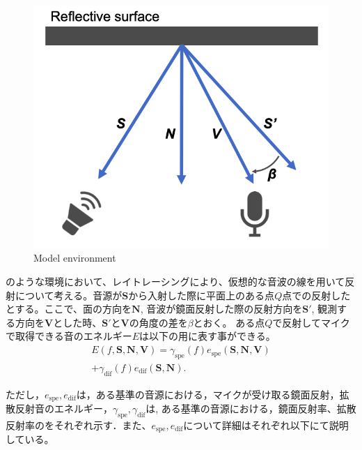 \begin{figure}[t]
  \begin{center}
  \vspace{1zh}
    \includegraphics[width=0.7\linewidth]{images/2_model_base_environment.png}   
  \end{center}
  \caption{Model environment}
  \label{fig:model_env}
\end{figure}

のような環境において、レイトレーシングにより、仮想的な音波の線を用いて反射について考える。音源が$\mathbf{S}$から入射した際に平面上のある点$Q$点での反射したとする。ここで、面の方向を$\mathbf{N}$, 音波が鏡面反射した際の反射方向を$\mathbf{S'}$, 観測する方向を$\mathbf{V}$とした時、$\mathbf{S'}$と$\mathbf{V}$の角度の差を$\beta$とおく。
ある点$Q$で反射してマイクで取得できる音のエネルギー$E$は以下の用に表す事ができる。
\begin{equation}
\begin{aligned}
    \label{equ:all-reflection}
        E(f, \mathbf{S}, \mathbf{N}, \mathbf{V}) 
        = \gamma_\mathrm{spe}(f) e_\mathrm{spe}(\mathbf{S}, \mathbf{N}, \mathbf{V})\\
        + \gamma_\mathrm{dif}(f) e_\mathrm{dif}(\mathbf{S}, \mathbf{N}).
\end{aligned}
\end{equation}

ただし，$ e_\mathrm{spe}, e_\mathrm{dif} $は，ある基準の音源における，マイクが受け取る鏡面反射，拡散反射音のエネルギー，$\gamma_\mathrm{spe}, \gamma_\mathrm{dif} $は, ある基準の音源における，鏡面反射率、拡散反射率のをそれぞれ示す．また、$ e_\mathrm{spe}, e_\mathrm{dif} $について詳細はそれぞれ以下にて説明している。

